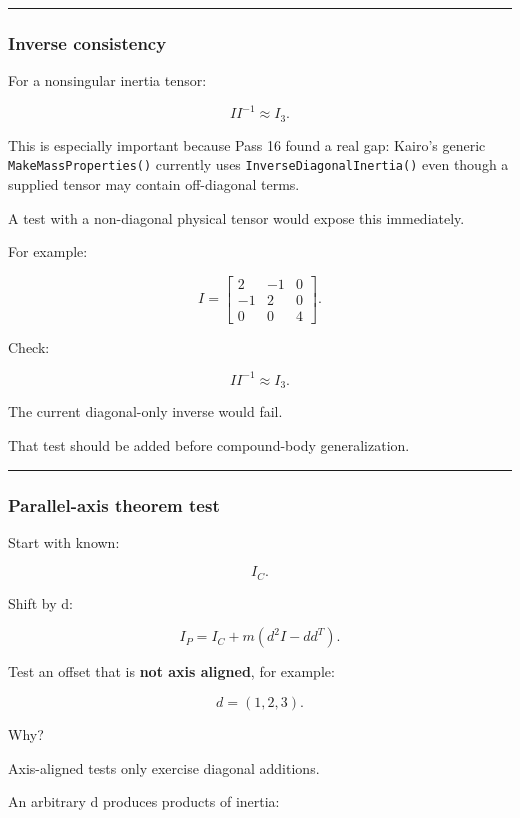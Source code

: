 \begin{center}\rule{0.5\linewidth}{0.5pt}\end{center}

\subsubsection{Inverse consistency}\label{inverse-consistency}

For a nonsingular inertia tensor:

\[
\boxed{
II^{-1}\approx I_3.
}
\]

This is especially important because Pass 16 found a real gap: Kairo's generic \texttt{MakeMassProperties()} currently uses \texttt{InverseDiagonalInertia()} even though a supplied tensor may contain off-diagonal terms.

A test with a non-diagonal physical tensor would expose this immediately.

For example:

\[
I=
\begin{bmatrix}
2&-1&0\\
-1&2&0\\
0&0&4
\end{bmatrix}.
\]

Check:

\[
II^{-1}\approx I_3.
\]

The current diagonal-only inverse would fail.

That test should be added before compound-body generalization.

\begin{center}\rule{0.5\linewidth}{0.5pt}\end{center}

\subsubsection{Parallel-axis theorem test}\label{parallel-axis-theorem-test}

Start with known:

\[
I_C.
\]

Shift by d:

\[
I_P
=
I_C+
m(d^2I-dd^T).
\]

Test an offset that is \textbf{not axis aligned}, for example:

\[
d=(1,2,3).
\]

Why?

Axis-aligned tests only exercise diagonal additions.

An arbitrary d produces products of inertia:

